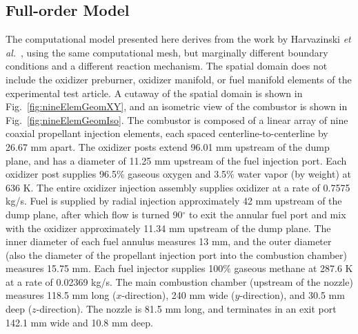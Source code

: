 \subsection{Full-order Model}
%
The computational model presented here derives from the work by Harvazinski \textit{et al.}~\cite{Harvazinski2019}, using the same computational mesh, but marginally different boundary conditions and a different reaction mechanism. The spatial domain does not include the oxidizer preburner, oxidizer manifold, or fuel manifold elements of the experimental test article. A cutaway of the spatial domain is shown in Fig.~\ref{fig:nineElemGeomXY}, and an isometric view of the combustor is shown in Fig.~\ref{fig:nineElemGeomIso}. The combustor is composed of a linear array of nine coaxial propellant injection elements, each spaced centerline-to-centerline by 26.67 mm apart. The oxidizer posts extend 96.01 mm upstream of the dump plane, and has a diameter of 11.25 mm upstream of the fuel injection port. Each oxidizer post supplies 96.5\% gaseous oxygen and 3.5\% water vapor (by weight) at 636 K. The entire oxidizer injection assembly supplies oxidizer at a rate of 0.7575 kg/s. Fuel is supplied by radial injection approximately 42 mm upstream of the dump plane, after which flow is turned 90$^{\circ}$ to exit the annular fuel port and mix with the oxidizer approximately 11.34 mm upstream of the dump plane. The inner diameter of each fuel annulus measures 13 mm, and the outer diameter (also the diameter of the propellant injection port into the combustion chamber) measures 15.75 mm. Each fuel injector supplies 100\% gaseous methane at 287.6 K at a rate of 0.02369 kg/s. The main combustion chamber (upstream of the nozzle) measures 118.5 mm long ($x$-direction), 240 mm wide ($y$-direction), and 30.5 mm deep ($z$-direction). The nozzle is 81.5 mm long, and terminates in an exit port 142.1 mm wide and 10.8 mm deep.

